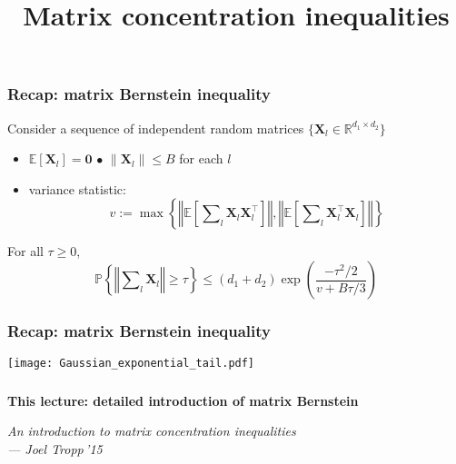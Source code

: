 \documentclass[compress,
mathserif,wide,%
]{beamer}
\title %
[Matrix concentration]{Matrix concentration inequalities}
\begin{document}
\begin{frame}[plain]
  \titlepage

\end{frame}








\begin{frame}
\frametitle{Recap: matrix Bernstein inequality}

Consider a sequence of independent random matrices $\big\{ \bm{X}_{l}\in\mathbb{R}^{d_{1}\times d_{2}}\big\} $
%
\begin{itemize}
	\itemsep0.5em
	\item $\mathbb{E}[\bm{X}_l]=\bm{0}$ \qquad\qquad\qquad\qquad\qquad $\bullet$ $\|\bm{X}_{l}\|\leq B$ for each $l$
	\item variance statistic: 
	$$v:=\max\left\{  \left\Vert  \mathbb{E}\left[ \sum\nolimits_{l} \bm{X}_{l}\bm{X}_{l}^{\top}  \right]  \right\Vert  ,  
			  \left\Vert  \mathbb{E}\left[ \sum\nolimits_{l} \bm{X}_{l}^{\top}\bm{X}_{l}  \right]  \right\Vert  \right\} $$
\end{itemize}

\begin{theorem}\label{thm:mtx-Bernstein}
%
For all $\tau \geq 0$,
\vspace{-1em}
\[
\mathbb{P}\left\{ \left\Vert \sum\nolimits_{l}\bm{X}_{l}\right\Vert \geq \tau\right\} \leq\left(d_{1}+d_{2}\right)\exp\left(\frac{-\tau^{2}/2}{v+B\tau/3}\right)
\]
%
\end{theorem}

\end{frame}



\begin{frame}
\frametitle{Recap: matrix Bernstein inequality}

	\begin{center}
		\texttt{[image: Gaussian\_exponential\_tail.pdf]}
	\end{center}

\end{frame}





\begin{frame}[plain]
\frametitle{}  

\vfill
\centering
	{\large\bf This lecture: detailed introduction of  matrix Bernstein}

\bigskip
\bigskip

\hfill {\small\em An introduction to matrix concentration inequalities \\ \hfill --- Joel Tropp\,'15}

\vfill

\end{frame}
\end{document}
